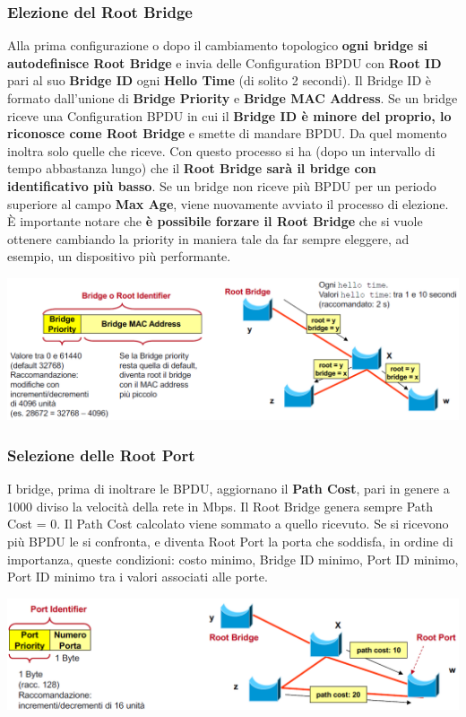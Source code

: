 \documentclass[12pt]{article}
\begin{document}
\subsubsection{Elezione del Root Bridge}

Alla prima configurazione o dopo il cambiamento topologico \textbf{ogni bridge si autodefinisce Root Bridge} e invia delle Configuration BPDU con \textbf{Root ID} pari al suo \textbf{Bridge ID} ogni \textbf{Hello Time} (di solito 2 secondi). Il Bridge ID è formato dall'unione di \textbf{Bridge Priority} e \textbf{Bridge MAC Address}. Se un bridge riceve una Configuration BPDU in cui il \textbf{Bridge ID è minore del proprio, lo riconosce come Root Bridge} e smette di mandare BPDU. Da quel momento inoltra solo quelle che riceve. Con questo processo si ha (dopo un intervallo di tempo abbastanza lungo) che il \textbf{Root Bridge sarà il bridge con identificativo più basso}. Se un bridge non riceve più BPDU per un periodo superiore al campo \textbf{Max Age}, viene nuovamente avviato il processo di elezione. È importante notare che \textbf{è possibile forzare il Root Bridge} che si vuole ottenere cambiando la priority in maniera tale da far sempre eleggere, ad esempio, un dispositivo più performante.
\begin{center}
    \includegraphics[scale=0.25]{spanning_tree_root_bridge}
\end{center}

\subsubsection{Selezione delle Root Port}

I bridge, prima di inoltrare le BPDU, aggiornano il \textbf{Path Cost}, pari in genere a 1000 diviso la velocità della rete in Mbps. Il Root Bridge genera sempre Path Cost = 0. Il Path Cost calcolato viene sommato a quello ricevuto. Se si ricevono più BPDU le si confronta, e diventa Root Port la porta che soddisfa, in ordine di importanza, queste condizioni: costo minimo, Bridge ID minimo, Port ID minimo, Port ID minimo tra i valori associati alle porte.
\begin{center}
    \includegraphics[scale=0.5]{spanning_tree_root_port}
\end{center}
\end{document}
